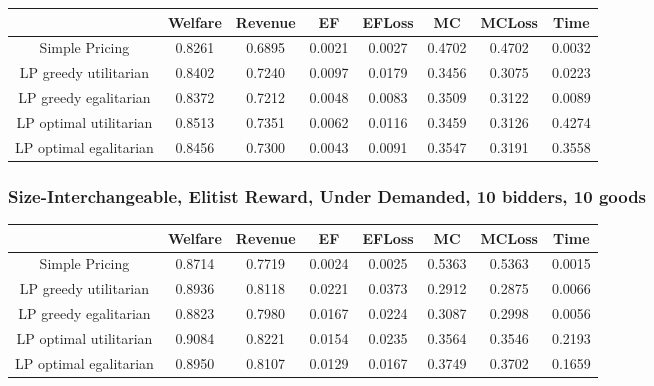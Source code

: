 \begin{tabular}{|c|c|c|c|c|c|c|c|}\hline
                            	&Welfare	&Revenue	&EF	&EFLoss	&MC	&MCLoss	&Time	\\\hline
                Simple Pricing	&0.8261	&0.6895	&0.0021	&0.0027	&0.4702	&0.4702	&0.0032	\\\hline 
         LP greedy utilitarian	&0.8402	&0.7240	&0.0097	&0.0179	&0.3456	&0.3075	&0.0223	\\\hline 
         LP greedy egalitarian	&0.8372	&0.7212	&0.0048	&0.0083	&0.3509	&0.3122	&0.0089	\\\hline 
        LP optimal utilitarian	&0.8513	&0.7351	&0.0062	&0.0116	&0.3459	&0.3126	&0.4274	\\\hline 
        LP optimal egalitarian	&0.8456	&0.7300	&0.0043	&0.0091	&0.3547	&0.3191	&0.3558	\\\hline 
\end{tabular}\subsubsection*{Size-Interchangeable, Elitist Reward, Under Demanded, 10 bidders, 10 goods} 
\begin{tabular}{|c|c|c|c|c|c|c|c|}\hline
                            	&Welfare	&Revenue	&EF	&EFLoss	&MC	&MCLoss	&Time	\\\hline
                Simple Pricing	&0.8714	&0.7719	&0.0024	&0.0025	&0.5363	&0.5363	&0.0015	\\\hline 
         LP greedy utilitarian	&0.8936	&0.8118	&0.0221	&0.0373	&0.2912	&0.2875	&0.0066	\\\hline 
         LP greedy egalitarian	&0.8823	&0.7980	&0.0167	&0.0224	&0.3087	&0.2998	&0.0056	\\\hline 
        LP optimal utilitarian	&0.9084	&0.8221	&0.0154	&0.0235	&0.3564	&0.3546	&0.2193	\\\hline 
        LP optimal egalitarian	&0.8950	&0.8107	&0.0129	&0.0167	&0.3749	&0.3702	&0.1659	\\\hline 
\end{tabular}